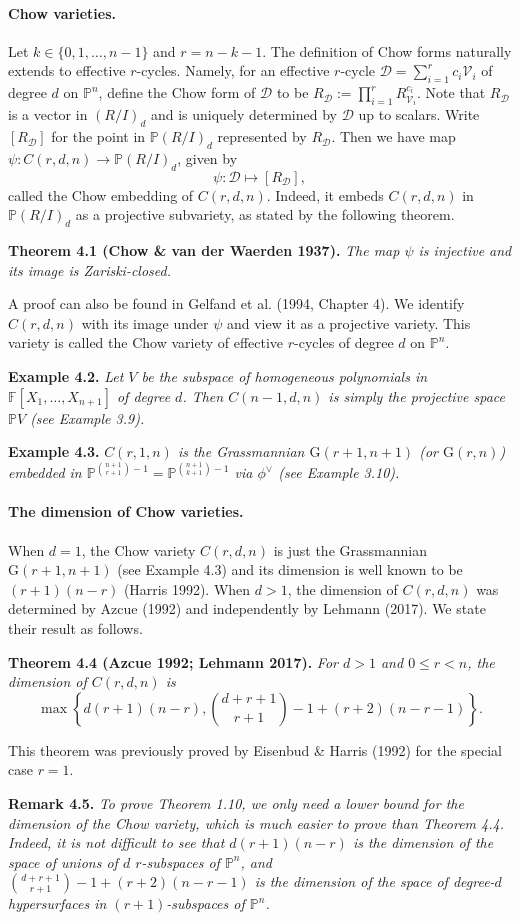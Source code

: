 \documentclass[10pt,a4paper]{article}
\newcommand{\FF}{\mathbb F}
\newcommand{\PP}{\mathbb P}
\newcommand{\GG}{\mathrm G}
\newenvironment{result}[1]{\par\medskip\noindent\textbf{#1.}\itshape}{\par\medskip}
\begin{document}
\paragraph{Chow varieties.}
Let $k\in\{0,1,\ldots,n-1\}$ and $r=n-k-1$. The definition of Chow forms naturally extends to effective $r$-cycles. Namely, for an effective $r$-cycle $\mathcal D=\sum_{i=1}^r c_i\mathcal V_i$ of degree $d$ on $\PP^n$, define the Chow form of $\mathcal D$ to be $R_{\mathcal D}:=\prod_{i=1}^r R_{\mathcal V_i}^{c_i}$.
Note that $R_{\mathcal D}$ is a vector in $(R/I)_d$ and is uniquely determined by $\mathcal D$ up to scalars. Write $[R_{\mathcal D}]$ for the point in $\PP(R/I)_d$ represented by $R_{\mathcal D}$. Then we have map $\psi:C(r,d,n)\to\PP(R/I)_d$, given by
\[\psi:\mathcal D\mapsto[R_{\mathcal D}],\]
called the Chow embedding of $C(r,d,n)$. Indeed, it embeds $C(r,d,n)$ in $\PP(R/I)_d$ as a projective subvariety, as stated by the following theorem.
\begin{result}{Theorem 4.1 (Chow \& van der Waerden 1937)}
The map $\psi$ is injective and its image is Zariski-closed.
\end{result}
A proof can also be found in Gelfand et al. (1994, Chapter 4). We identify $C(r,d,n)$ with its image under $\psi$ and view it as a projective variety. This variety is called the Chow variety of effective $r$-cycles of degree $d$ on $\PP^n$.
\begin{result}{Example 4.2}
Let $V$ be the subspace of homogeneous polynomials in $\FF[X_1,\ldots,X_{n+1}]$ of degree $d$. Then $C(n-1,d,n)$ is simply the projective space $\PP V$ (see Example 3.9).
\end{result}
\begin{result}{Example 4.3}
$C(r,1,n)$ is the Grassmannian $\GG(r+1,n+1)$ (or $\GG(r,n)$) embedded in $\PP^{\binom{n+1}{r+1}-1}=\PP^{\binom{n+1}{k+1}-1}$ via $\phi^\vee$ (see Example 3.10).
\end{result}
\paragraph{The dimension of Chow varieties.}
When $d=1$, the Chow variety $C(r,d,n)$ is just the Grassmannian $\GG(r+1,n+1)$ (see Example 4.3) and its dimension is well known to be $(r+1)(n-r)$ (Harris 1992). When $d>1$, the dimension of $C(r,d,n)$ was determined by Azcue (1992) and independently by Lehmann (2017). We state their result as follows.
\begin{result}{Theorem 4.4 (Azcue 1992; Lehmann 2017)}
For $d>1$ and $0\le r<n$, the dimension of $C(r,d,n)$ is
\[\max\left\{d(r+1)(n-r),\binom{d+r+1}{r+1}-1+(r+2)(n-r-1)\right\}.\]
\end{result}
This theorem was previously proved by Eisenbud \& Harris (1992) for the special case $r=1$.
\begin{result}{Remark 4.5}
To prove Theorem 1.10, we only need a lower bound for the dimension of the Chow variety, which is much easier to prove than Theorem 4.4. Indeed, it is not difficult to see that $d(r+1)(n-r)$ is the dimension of the space of unions of $d$ $r$-subspaces of $\PP^n$, and $\binom{d+r+1}{r+1}-1+(r+2)(n-r-1)$ is the dimension of the space of degree-$d$ hypersurfaces in $(r+1)$-subspaces of $\PP^n$.
\end{result}
\end{document}
